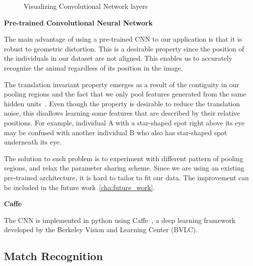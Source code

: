 \begin{figure}[h!]
  \captionsetup{justification=centering}
  \caption{Visualizing Convolutional Network layers}
\end{figure}


\textbf{Pre-trained Convolutional Neural Network}

The main advantage of using a pre-trained CNN to our application is that it is
robust to geometric distortion. This is a desirable property since the position
of the individuals in our dataset are not aligned. This enables us to
accurately recognize the animal regardless of its position in the image. 

The translation invariant property emerges as a result of the contiguity in our
pooling regions and the fact that we only pool features generated from the same
hidden units~\cite{ufldl}. Even though the property is desirable to reduce the
translation noise, this disallows learning some features that are described by
their relative positions. For example, individual A with a star-shaped spot
right above its eye may be confused with another individual B who also has
star-shaped spot underneath its eye. 

The solution to such problem is to experiment with different pattern of pooling
regions, and relax the parameter sharing scheme. Since we are using an existing
pre-trained architecture, it is hard to tailor to fit our data. The improvement
can be included in the future work~\ref{cha:future_work}.

\textbf{Caffe}

The CNN is implemented in python using Caffe~\cite{caffe}, a deep learning
framework developed by the Berkeley Vision and Learning Center (BVLC).

\subsection{Match Recognition}

